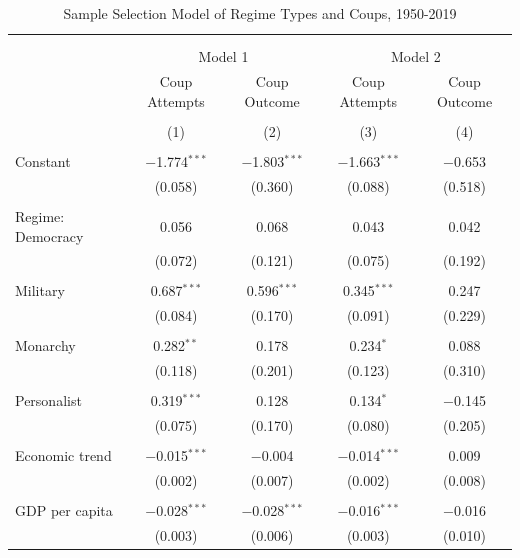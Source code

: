 \documentclass[
  12pt,
]{report}
\begin{document}
\begin{table}[!htbp] \centering 
  \caption{Sample Selection Model of Regime Types and Coups, 1950-2019} 
  \label{results} 
\small 
\begin{tabular}{@{\extracolsep{7pt}}lcccc} 
\\[-1.8ex]\hline 
\hline \\[-1.8ex] 
\\[-1.8ex] & \multicolumn{2}{c}{Model 1} & \multicolumn{2}{c}{Model 2} \\ 
 & Coup Attempts & Coup Outcome & Coup Attempts & Coup Outcome \\ 
\\[-1.8ex] & (1) & (2) & (3) & (4)\\ 
\hline \\[-1.8ex] 
 Constant & $-$1.774$^{***}$ & $-$1.803$^{***}$ & $-$1.663$^{***}$ & $-$0.653 \\ 
  & (0.058) & (0.360) & (0.088) & (0.518) \\ 
  & & & & \\ 
 Regime: Democracy & 0.056 & 0.068 & 0.043 & 0.042 \\ 
  & (0.072) & (0.121) & (0.075) & (0.192) \\ 
  & & & & \\ 
 \hspace{1.6cm}Military & 0.687$^{***}$ & 0.596$^{***}$ & 0.345$^{***}$ & 0.247 \\ 
  & (0.084) & (0.170) & (0.091) & (0.229) \\ 
  & & & & \\ 
 \hspace{1.6cm}Monarchy & 0.282$^{**}$ & 0.178 & 0.234$^{*}$ & 0.088 \\ 
  & (0.118) & (0.201) & (0.123) & (0.310) \\ 
  & & & & \\ 
 \hspace{1.6cm}Personalist & 0.319$^{***}$ & 0.128 & 0.134$^{*}$ & $-$0.145 \\ 
  & (0.075) & (0.170) & (0.080) & (0.205) \\ 
  & & & & \\ 
 Economic trend & $-$0.015$^{***}$ & $-$0.004 & $-$0.014$^{***}$ & 0.009 \\ 
  & (0.002) & (0.007) & (0.002) & (0.008) \\ 
  & & & & \\ 
 GDP per capita & $-$0.028$^{***}$ & $-$0.028$^{***}$ & $-$0.016$^{***}$ & $-$0.016 \\ 
  & (0.003) & (0.006) & (0.003) & (0.010) \\ 

\end{tabular}
\end{table}
\end{document}
